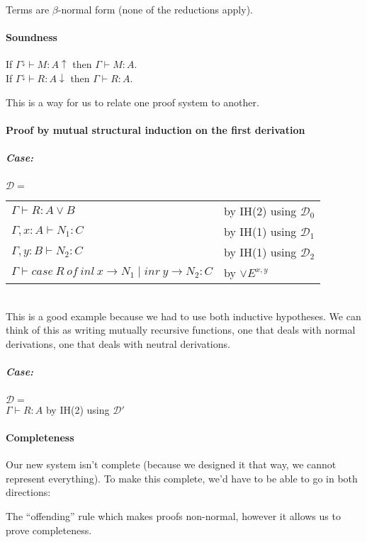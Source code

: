 \documentclass[12 pt]{article}
\begin{document}
	Terms are $\beta$-normal form (none of the reductions apply).
	\paragraph{Soundness} If $\Gamma^{\downarrow} \vdash M : A
\uparrow$ then $\Gamma \vdash M : A$.
	\\ If $\Gamma^{\downarrow} \vdash R:A \downarrow$ then $\Gamma
\vdash R : A$.

	This is a way for us to relate one proof system to another.

	\paragraph{Proof by mutual structural induction on  the first
		derivation}
	\subparagraph{Case:} $\mathcal{D} =$
	\noLine
	\noLine
	\noLine
	\DP
	\\
	\begin{tabular}{l l}
		$\Gamma \vdash R : A \lor B$ & by IH(2) using $\mathcal{D}_0$
		\\ $\Gamma, x : A \vdash N_1 : C$ & by IH(1) using $\mathcal{D}_1$
		\\ $\Gamma, y : B \vdash N_2 : C$ & by IH(1) using $\mathcal{D}_2$
		\\ $\Gamma \vdash case\ R \ of \ inl\ x \to N_1 \mid inr\ y \to N_2 : C$ & by $\lor E^{x,y}$
	\end{tabular}
	\\This is a good example because we had to use both inductive
	hypotheses. We can think of this as writing mutually recursive
	functions, one that deals with normal derivations, one that
	deals with neutral derivations.
	\subparagraph{Case:} $\mathcal{D}=$
	\noLine{}\DP
	\\ $\Gamma \vdash R : A$ by IH(2) using $\mathcal{D}'$
	\paragraph{Completeness} Our new system isn't complete
	(because we designed it that way, we cannot represent
	everything). To make this complete, we'd have to be able to go
	in both directions:
	\begin{prooftree}
	\end{prooftree}
	The ``offending'' rule which makes proofs non-normal, however
	it allows us to prove completeness.
\end{document}

